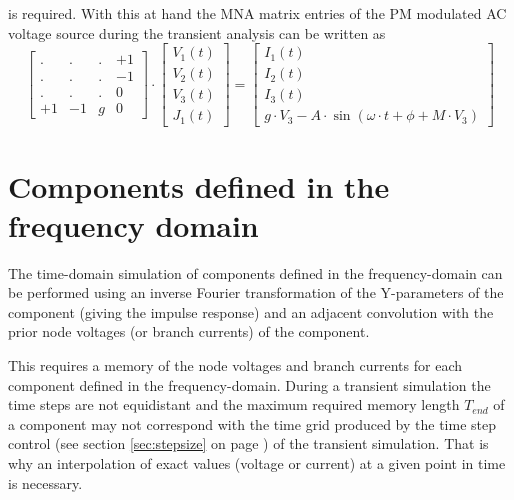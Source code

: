is required.  With this at hand the MNA matrix entries of the PM
modulated AC voltage source during the transient analysis can be
written as
\begin{equation}
\begin{bmatrix}
. & . & . & +1\\
. & . & . & -1\\
. & . & . & 0\\
+1 & -1 & g & 0
\end{bmatrix}
\cdot
\begin{bmatrix}
V_1\left(t\right)\\
V_2\left(t\right)\\
V_3\left(t\right)\\
J_1\left(t\right)
\end{bmatrix}
=
\begin{bmatrix}
I_1\left(t\right)\\
I_2\left(t\right)\\
I_3\left(t\right)\\
g\cdot V_3 - A\cdot \sin{\left(\omega\cdot t + \phi + M\cdot V_3\right)}
\end{bmatrix}
\end{equation}

\section{Components defined in the frequency domain}

The time-domain simulation of components defined in the
frequency-domain can be performed using an inverse Fourier
transformation of the Y-parameters of the component (giving the
impulse response) and an adjacent convolution with the prior node
voltages (or branch currents) of the component.

\addvspace{12pt}

This requires a memory of the node voltages and branch currents for
each component defined in the frequency-domain.  During a transient
simulation the time steps are not equidistant and the maximum required
memory length $T_{end}$ of a component may not correspond with the
time grid produced by the time step control (see section
\ref{sec:stepsize} on page \pageref{sec:stepsize}) of the transient
simulation.  That is why an interpolation of exact values (voltage or
current) at a given point in time is necessary.

\addvspace{12pt}

